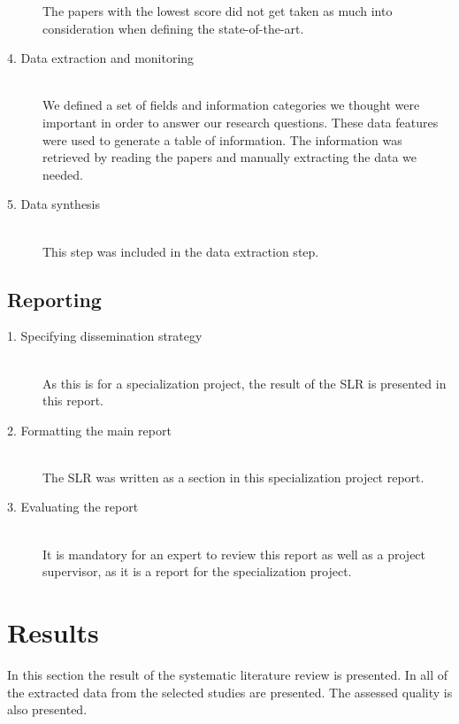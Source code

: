 \begin{description}
		The papers with the lowest score did not get taken as much into consideration when defining the state-of-the-art. 
		
	\item[4. Data extraction and monitoring] \hfill \\
		We defined a set of fields and information categories we thought were important in order to answer our research questions. These data features were used to generate a table of information. The information was retrieved by reading the papers and manually extracting the data we needed.
	

	\item[5. Data synthesis] \hfill \\
		This step was included in the data extraction step.
\end{description}


\subsection{Reporting}


\begin{description}

	\item[1. Specifying dissemination strategy] \hfill \\
		As this is for a specialization project, the result of the SLR is presented in this report.  

	\item[2. Formatting the main report] \hfill \\
		The SLR was written as a section in this specialization project report. 

	\item[3. Evaluating the report] \hfill \\
		It is mandatory for an expert to review this report as well as a project supervisor, as it is a report for the specialization project.

\end{description}

\section{Results}
\label{sec:slrresults}

In this section the result of the systematic literature review is presented. In  all of the extracted data from the selected studies are presented. The assessed quality is also presented. 

